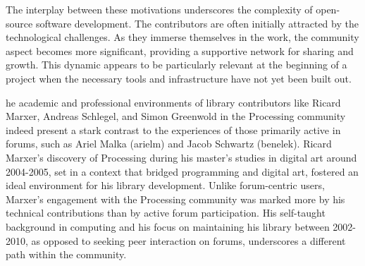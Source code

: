 The interplay between these motivations underscores the complexity of open-source software development. The contributors are often initially attracted by the technological challenges. As they immerse themselves in the work, the community aspect becomes more significant, providing a supportive network for sharing and growth. This dynamic appears to be particularly relevant at the beginning of a project when the necessary tools and infrastructure have not yet been built out.





he academic and professional environments of library contributors like Ricard Marxer, Andreas Schlegel, and Simon Greenwold in the Processing community indeed present a stark contrast to the experiences of those primarily active in forums, such as Ariel Malka (arielm) and Jacob Schwartz (benelek).
Ricard Marxer's discovery of Processing during his master's studies in digital art around 2004-2005, set in a context that bridged programming and digital art, fostered an ideal environment for his library development. Unlike forum-centric users, Marxer's engagement with the Processing community was marked more by his technical contributions than by active forum participation. His self-taught background in computing and his focus on maintaining his library between 2002-2010, as opposed to seeking peer interaction on forums, underscores a different path within the community​​​​.

